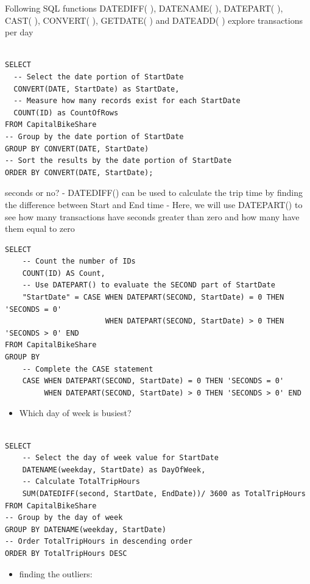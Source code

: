 \documentclass[]{book}
\providecommand{\tightlist}{%
  \setlength{\itemsep}{0pt}\setlength{\parskip}{0pt}}
\begin{document}
Following SQL functions DATEDIFF( ), DATENAME( ), DATEPART( ), CAST( ), CONVERT( ), GETDATE( ) and DATEADD( ) explore transactions per day

\begin{verbatim}

SELECT
  -- Select the date portion of StartDate
  CONVERT(DATE, StartDate) as StartDate,
  -- Measure how many records exist for each StartDate
  COUNT(ID) as CountOfRows 
FROM CapitalBikeShare 
-- Group by the date portion of StartDate
GROUP BY CONVERT(DATE, StartDate)
-- Sort the results by the date portion of StartDate
ORDER BY CONVERT(DATE, StartDate);
\end{verbatim}

seconds or no?
- DATEDIFF() can be used to calculate the trip time by finding the difference between Start and End time
- Here, we will use DATEPART() to see how many transactions have seconds greater than zero and how many have them equal to zero

\begin{verbatim}
SELECT
	-- Count the number of IDs
	COUNT(ID) AS Count,
    -- Use DATEPART() to evaluate the SECOND part of StartDate
    "StartDate" = CASE WHEN DATEPART(SECOND, StartDate) = 0 THEN 'SECONDS = 0'
					   WHEN DATEPART(SECOND, StartDate) > 0 THEN 'SECONDS > 0' END
FROM CapitalBikeShare
GROUP BY
    -- Complete the CASE statement
	CASE WHEN DATEPART(SECOND, StartDate) = 0 THEN 'SECONDS = 0'
		 WHEN DATEPART(SECOND, StartDate) > 0 THEN 'SECONDS > 0' END
\end{verbatim}

\begin{itemize}
\tightlist
\item
  Which day of week is busiest?
\end{itemize}

\begin{verbatim}

SELECT
    -- Select the day of week value for StartDate
	DATENAME(weekday, StartDate) as DayOfWeek,
    -- Calculate TotalTripHours
	SUM(DATEDIFF(second, StartDate, EndDate))/ 3600 as TotalTripHours 
FROM CapitalBikeShare 
-- Group by the day of week
GROUP BY DATENAME(weekday, StartDate)
-- Order TotalTripHours in descending order
ORDER BY TotalTripHours DESC
\end{verbatim}

\begin{itemize}
\tightlist
\item
  finding the outliers:
\end{itemize}
\end{document}
